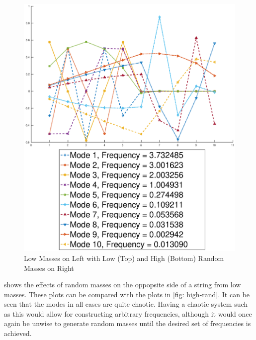 \documentclass[10pt,a4paper]{article}
\begin{document}
\begin{multicols*}{2}
\begin{figure}[H]
	\includegraphics[width=\columnwidth]{figures/low-highrand.eps}
	\caption{Low Masses on Left with Low (Top) and High (Bottom) Random Masses on Right}
	\label{fig: low-rand}
\end{figure}

 shows the effects of random masses on the oppopsite side of a string from low masses. These plots can be compared with the plots in \cref{fig: high-rand}. It can be seen that the modes in all cases are quite chaotic. Having a chaotic system such as this would allow for constructing arbitrary frequencies, although it would once again be unwise to generate random masses until the desired set of frequencies is achieved.


\end{multicols*}
\end{document}
